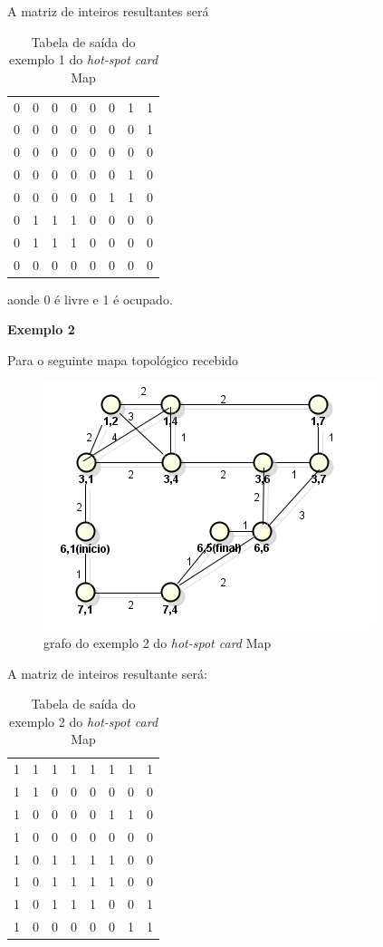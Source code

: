 \begin{anexosenv}
A matriz de inteiros resultantes será

\begin{table}[H]
\centering
\caption{Tabela de saída do exemplo 1 do \textit{hot-spot card} Map}
\begin{tabular}{|c|c|c|c|c|c|c|c|}
0 & 0 & 0 & 0 & 0 & 0 & 1 & 1 \\
0 & 0 & 0 & 0 & 0 & 0 & 0 & 1 \\
0 & 0 & 0 & 0 & 0 & 0 & 0 & 0 \\
0 & 0 & 0 & 0 & 0 & 0 & 1 & 0 \\
0 & 0 & 0 & 0 & 0 & 1 & 1 & 0 \\
0 & 1 & 1 & 1 & 0 & 0 & 0 & 0 \\
0 & 1 & 1 & 1 & 0 & 0 & 0 & 0 \\
0 & 0 & 0 & 0 & 0 & 0 & 0 & 0
\end{tabular}
\end{table}

aonde 0 é livre e 1 é ocupado.

{\large \textbf{Exemplo 2}}

Para o seguinte mapa topológico recebido

\begin{figure}[H]
	\centering
	\label{figXX3}
		\includegraphics[keepaspectratio=true,scale=0.7]{figuras/grafohotspotcard2.PNG}
	\caption{grafo do exemplo 2 do \textit{hot-spot card} Map}
\end{figure}

A matriz de inteiros resultante será:

\begin{table}[H]
\centering
\caption{Tabela de saída do exemplo 2 do \textit{hot-spot card} Map}
\begin{tabular}{|c|c|c|c|c|c|c|c|}
1 & 1 & 1 & 1 & 1 & 1 & 1 & 1 \\
1 & 1 & 0 & 0 & 0 & 0 & 0 & 0 \\
1 & 0 & 0 & 0 & 0 & 1 & 1 & 0 \\
1 & 0 & 0 & 0 & 0 & 0 & 0 & 0 \\
1 & 0 & 1 & 1 & 1 & 1 & 0 & 0 \\
1 & 0 & 1 & 1 & 1 & 1 & 0 & 0 \\
1 & 0 & 1 & 1 & 1 & 0 & 0 & 1 \\
1 & 0 & 0 & 0 & 0 & 0 & 1 & 1 \\
\end{tabular}
\end{table}


\end{anexosenv}
